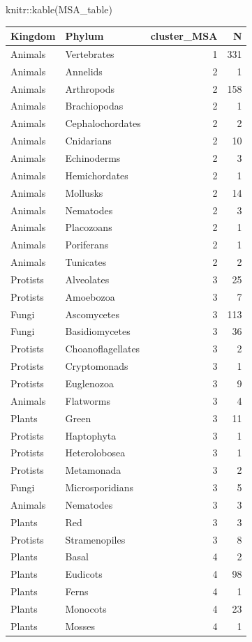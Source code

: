 \documentclass[
  letterpaper,
  DIV=11,
  numbers=noendperiod]{scrreprt}
\newenvironment{Shaded}{}{}
\newcommand{\FunctionTok}[1]{\textcolor[rgb]{0.38,0.69,0.94}{#1}}
\newcommand{\NormalTok}[1]{\textcolor[rgb]{0.67,0.70,0.75}{#1}}
\newcommand{\SpecialCharTok}[1]{\textcolor[rgb]{0.34,0.71,0.76}{#1}}
\begin{document}
\begin{Shaded}
\begin{Highlighting}[]
\NormalTok{knitr}\SpecialCharTok{::}\FunctionTok{kable}\NormalTok{(MSA\_table)}
\end{Highlighting}
\end{Shaded}

\begin{tabular}{l|l|r|r}
\hline
Kingdom & Phylum & cluster\_MSA & N\\
\hline
Animals & Vertebrates & 1 & 331\\
\hline
Animals & Annelids & 2 & 1\\
\hline
Animals & Arthropods & 2 & 158\\
\hline
Animals & Brachiopodas & 2 & 1\\
\hline
Animals & Cephalochordates & 2 & 2\\
\hline
Animals & Cnidarians & 2 & 10\\
\hline
Animals & Echinoderms & 2 & 3\\
\hline
Animals & Hemichordates & 2 & 1\\
\hline
Animals & Mollusks & 2 & 14\\
\hline
Animals & Nematodes & 2 & 3\\
\hline
Animals & Placozoans & 2 & 1\\
\hline
Animals & Poriferans & 2 & 1\\
\hline
Animals & Tunicates & 2 & 2\\
\hline
Protists & Alveolates & 3 & 25\\
\hline
Protists & Amoebozoa & 3 & 7\\
\hline
Fungi & Ascomycetes & 3 & 113\\
\hline
Fungi & Basidiomycetes & 3 & 36\\
\hline
Protists & Choanoflagellates & 3 & 2\\
\hline
Protists & Cryptomonads & 3 & 1\\
\hline
Protists & Euglenozoa & 3 & 9\\
\hline
Animals & Flatworms & 3 & 4\\
\hline
Plants & Green & 3 & 11\\
\hline
Protists & Haptophyta & 3 & 1\\
\hline
Protists & Heterolobosea & 3 & 1\\
\hline
Protists & Metamonada & 3 & 2\\
\hline
Fungi & Microsporidians & 3 & 5\\
\hline
Animals & Nematodes & 3 & 3\\
\hline
Plants & Red & 3 & 3\\
\hline
Protists & Stramenopiles & 3 & 8\\
\hline
Plants & Basal & 4 & 2\\
\hline
Plants & Eudicots & 4 & 98\\
\hline
Plants & Ferns & 4 & 1\\
\hline
Plants & Monocots & 4 & 23\\
\hline
Plants & Mosses & 4 & 1\\
\hline
\end{tabular}
\end{document}

